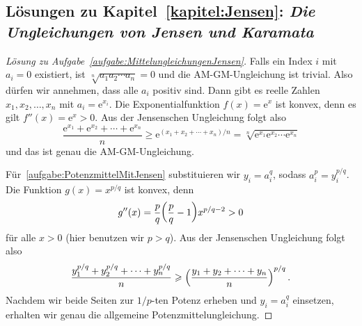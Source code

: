 \subsection*{Lösungen zu Kapitel~\ref{kapitel:Jensen}: \emph{Die Ungleichungen von Jensen und Karamata}}

\begin{proof}[Lösung zu Aufgabe~\ref{aufgabe:MittelungleichungenJensen}]
	Falls ein Index $i$ mit $a_i=0$ existiert, ist $\sqrt[n]{a_1a_2\dotsm a_n}=0$ und die AM-GM-Ungleichung ist trivial. Also dürfen wir annehmen, dass alle $a_i$ positiv sind. Dann gibt es reelle Zahlen $x_1,x_2,\dotsc,x_n$ mit $a_i=\mathrm{e}^{x_i}$. Die Exponentialfunktion $f(x)=\mathrm{e}^x$ ist konvex, denn es gilt $f''(x)=\mathrm{e}^x>0$. Aus der Jensenschen Ungleichung folgt also
	\begin{equation*}
		\frac{\mathrm{e}^{x_1}+\mathrm{e}^{x_2}+\dotsb+\mathrm{e}^{x_n}}{n}\geqslant \mathrm{e}^{(x_1+x_2+\dotsb+x_n)/n}=\sqrt[n]{\mathrm{e}^{x_1}\mathrm{e}^{x_2}\dotsm \mathrm{e}^{x_n}}
	\end{equation*}
	und das ist genau die AM-GM-Ungleichung.
	
	Für~\ref{aufgabe:PotenzmittelMitJensen} substituieren wir $y_i=a_i^q$, sodass $a_i^p=y_i^{p/q}$. Die Funktion $g(x)=x^{p/q}$ ist konvex, denn
	\begin{equation*}
		g''(x)=\frac pq\parens*{\frac pq-1}x^{p/q-2}>0
	\end{equation*}
	für alle $x>0$ (hier benutzen wir $p>q$). Aus der Jensenschen Ungleichung folgt also
	\begin{equation*}
		\frac{y_1^{p/q}+y_2^{p/q}+\dotsb+y_n^{p/q}}{n}\geqslant \parens*{\frac{y_1+y_2+\dotsb+y_n}{n}}^{p/q}\,.
	\end{equation*}
	Nachdem wir beide Seiten zur $1/p$-ten Potenz erheben und $y_i=a_i^q$ einsetzen, erhalten wir genau die allgemeine Potenzmittelungleichung.
\end{proof}

